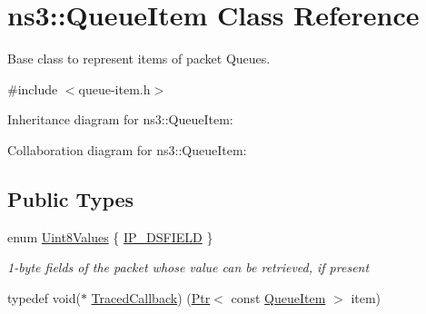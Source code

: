 \hypertarget{classns3_1_1QueueItem}{}\section{ns3\+:\+:Queue\+Item Class Reference}
\label{classns3_1_1QueueItem}


Base class to represent items of packet Queues.  




{\ttfamily \#include $<$queue-\/item.\+h$>$}



Inheritance diagram for ns3\+:\+:Queue\+Item\+:


Collaboration diagram for ns3\+:\+:Queue\+Item\+:
\subsection*{Public Types}
\begin{DoxyCompactItemize}
\item 
enum \hyperlink{classns3_1_1QueueItem_a9be6c7d46929336179fe00c3224eec9f}{Uint8\+Values} \{ \hyperlink{classns3_1_1QueueItem_a9be6c7d46929336179fe00c3224eec9fae5b31413391a0602166106f326465939}{I\+P\+\_\+\+D\+S\+F\+I\+E\+LD}
 \}\begin{DoxyCompactList}\small\item\em 1-\/byte fields of the packet whose value can be retrieved, if present \end{DoxyCompactList}
\item 
typedef void($\ast$ \hyperlink{classns3_1_1QueueItem_ad6d075dd27cd9568655a097e5a83ac44}{Traced\+Callback}) (\hyperlink{classns3_1_1Ptr}{Ptr}$<$ const \hyperlink{classns3_1_1QueueItem}{Queue\+Item} $>$ item)
\end{DoxyCompactItemize}
